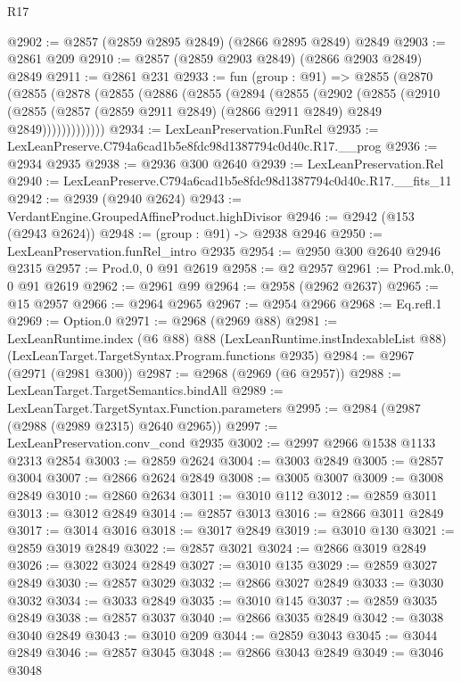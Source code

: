 \begin{lexlean}{R17}
\begin{coremodule}
@2902 := @2857 (@2859 @2895 @2849) (@2866 @2895 @2849) @2849
@2903 := @2861 @209
@2910 := @2857 (@2859 @2903 @2849) (@2866 @2903 @2849) @2849
@2911 := @2861 @231
@2933 := fun (group : @91) =>
  @2855
    (@2870
      (@2855
        (@2878
          (@2855
            (@2886
              (@2855
                (@2894
                  (@2855
                    (@2902
                      (@2855
                        (@2910
                          (@2855
                            (@2857 (@2859 @2911 @2849) (@2866 @2911 @2849) @2849 @2849)))))))))))))
@2934 := LexLeanPreservation.FunRel
@2935 := LexLeanPreserve.C794a6cad1b5e8fdc98d1387794c0d40c.R17.__prog
@2936 := @2934 @2935
@2938 := @2936 @300 @2640
@2939 := LexLeanPreservation.Rel
@2940 := LexLeanPreserve.C794a6cad1b5e8fdc98d1387794c0d40c.R17.__fits_11
@2942 := @2939 (@2940 @2624)
@2943 := VerdantEngine.GroupedAffineProduct.highDivisor
@2946 := @2942 (@153 (@2943 @2624))
@2948 := (group : @91) -> @2938 @2946
@2950 := LexLeanPreservation.funRel_intro @2935
@2954 := @2950 @300 @2640 @2946 @2315
@2957 := Prod.{0, 0} @91 @2619
@2958 := @2 @2957
@2961 := Prod.mk.{0, 0} @91 @2619
@2962 := @2961 @99
@2964 := @2958 (@2962 @2637)
@2965 := @15 @2957
@2966 := @2964 @2965
@2967 := @2954 @2966
@2968 := Eq.refl.{1}
@2969 := Option.{0}
@2971 := @2968 (@2969 @88)
@2981 := LexLeanRuntime.index
    (@6 @88)
    @88
    (LexLeanRuntime.instIndexableList @88)
    (LexLeanTarget.TargetSyntax.Program.functions @2935)
@2984 := @2967 (@2971 (@2981 @300))
@2987 := @2968 (@2969 (@6 @2957))
@2988 := LexLeanTarget.TargetSemantics.bindAll
@2989 := LexLeanTarget.TargetSyntax.Function.parameters
@2995 := @2984 (@2987 (@2988 (@2989 @2315) @2640 @2965))
@2997 := LexLeanPreservation.conv_cond @2935
@3002 := @2997 @2966 @1538 @1133 @2313 @2854
@3003 := @2859 @2624
@3004 := @3003 @2849
@3005 := @2857 @3004
@3007 := @2866 @2624 @2849
@3008 := @3005 @3007
@3009 := @3008 @2849
@3010 := @2860 @2634
@3011 := @3010 @112
@3012 := @2859 @3011
@3013 := @3012 @2849
@3014 := @2857 @3013
@3016 := @2866 @3011 @2849
@3017 := @3014 @3016
@3018 := @3017 @2849
@3019 := @3010 @130
@3021 := @2859 @3019 @2849
@3022 := @2857 @3021
@3024 := @2866 @3019 @2849
@3026 := @3022 @3024 @2849
@3027 := @3010 @135
@3029 := @2859 @3027 @2849
@3030 := @2857 @3029
@3032 := @2866 @3027 @2849
@3033 := @3030 @3032
@3034 := @3033 @2849
@3035 := @3010 @145
@3037 := @2859 @3035 @2849
@3038 := @2857 @3037
@3040 := @2866 @3035 @2849
@3042 := @3038 @3040 @2849
@3043 := @3010 @209
@3044 := @2859 @3043
@3045 := @3044 @2849
@3046 := @2857 @3045
@3048 := @2866 @3043 @2849
@3049 := @3046 @3048

\end{coremodule}
\end{lexlean}
